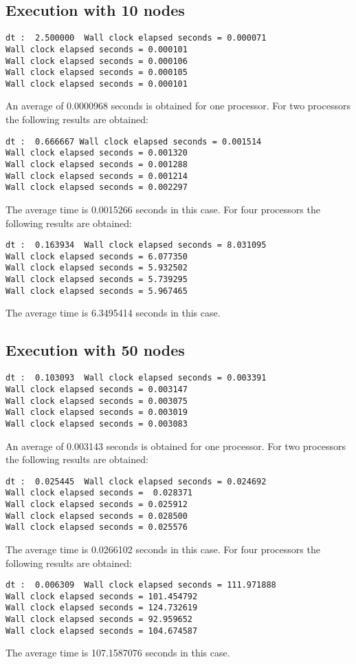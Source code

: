 \documentclass{article}
\begin{document}
\subsection{Execution with 10 nodes}
\begin{verbatim}
dt :  2.500000  Wall clock elapsed seconds = 0.000071
Wall clock elapsed seconds = 0.000101
Wall clock elapsed seconds = 0.000106
Wall clock elapsed seconds = 0.000105
Wall clock elapsed seconds = 0.000101
\end{verbatim}
An average of 0.0000968 seconds is obtained for one processor.
For two processors the following results are obtained:
\begin{verbatim}
dt :  0.666667 Wall clock elapsed seconds = 0.001514
Wall clock elapsed seconds = 0.001320
Wall clock elapsed seconds = 0.001288
Wall clock elapsed seconds = 0.001214
Wall clock elapsed seconds = 0.002297

\end{verbatim}
The average time is 0.0015266 seconds in this case. 
For four processors the following results are obtained:
\begin{verbatim}
dt :  0.163934  Wall clock elapsed seconds = 8.031095
Wall clock elapsed seconds = 6.077350
Wall clock elapsed seconds = 5.932502
Wall clock elapsed seconds = 5.739295
Wall clock elapsed seconds = 5.967465
\end{verbatim}
The average time is 6.3495414 seconds in this case.
\subsection{Execution with 50 nodes}
\begin{verbatim}
dt :  0.103093  Wall clock elapsed seconds = 0.003391
Wall clock elapsed seconds = 0.003147
Wall clock elapsed seconds = 0.003075
Wall clock elapsed seconds = 0.003019
Wall clock elapsed seconds = 0.003083
\end{verbatim}
An average of 0.003143 seconds is obtained for one processor.
For two processors the following results are obtained:
\begin{verbatim}
dt :  0.025445  Wall clock elapsed seconds = 0.024692
Wall clock elapsed seconds =  0.028371
Wall clock elapsed seconds = 0.025912
Wall clock elapsed seconds = 0.028500
Wall clock elapsed seconds = 0.025576
\end{verbatim}
The average time is 0.0266102 seconds in this case. 
For four processors the following results are obtained:
\begin{verbatim}
dt :  0.006309  Wall clock elapsed seconds = 111.971888
Wall clock elapsed seconds = 101.454792
Wall clock elapsed seconds = 124.732619
Wall clock elapsed seconds = 92.959652
Wall clock elapsed seconds = 104.674587
\end{verbatim}
The average time is 107.1587076 seconds in this case.
\end{document}
